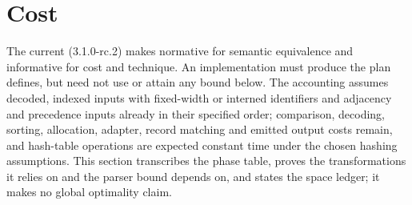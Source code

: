 \section{Cost}
\label{sec:complexity}

The current \SPEC{} (3.1.0-rc.2) makes  normative for semantic
equivalence and informative for cost and technique. An implementation must
produce the plan  defines, but need not use or attain any bound
below. The accounting assumes decoded, indexed inputs with fixed-width or
interned identifiers and adjacency and precedence inputs already in their
specified order; comparison, decoding, sorting, allocation, adapter, record
matching and emitted output costs remain, and hash-table operations are
expected constant time under the chosen hashing assumptions. This section
transcribes the phase table, proves the transformations it relies on and the
parser bound  depends on, and states the space ledger; it makes no
global optimality claim.

